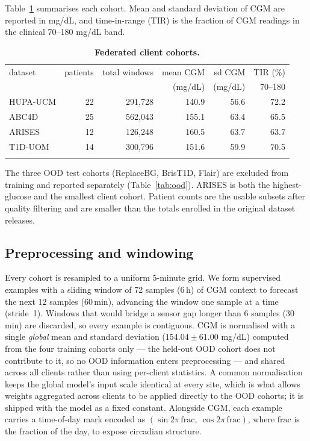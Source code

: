 \documentclass[10pt,letterpaper]{article}
\newlength\savedwidth
\newcommand\thickhline{\noalign{\global\savedwidth\arrayrulewidth\global\arrayrulewidth 2pt}%
\hline
\noalign{\global\arrayrulewidth\savedwidth}}
\begin{document}
Table~\ref{tab:datasets} summarises each cohort. Mean and standard deviation of
CGM are reported in mg/dL, and time-in-range (TIR) is the fraction of CGM
readings in the clinical 70--180 mg/dL band.

\begin{table}[!ht]
\centering
\captionsetup{justification=centering,singlelinecheck=on}
\caption{\bf Federated client cohorts.}
\label{tab:datasets}
\begin{tabular}{lrrrrr}
\thickhline
dataset & patients & total windows & mean CGM & sd CGM & TIR (\%) \\
        &          &               & (mg/dL)  & (mg/dL) & 70--180  \\
\hline
HUPA-UCM & 22 & 291,728 & 140.9 & 56.6 & 72.2 \\
ABC4D    & 25 & 562,043 & 155.1 & 63.4 & 65.5 \\
ARISES   & 12 & 126,248 & 160.5 & 63.7 & 63.7 \\
T1D-UOM  & 14 & 300,796 & 151.6 & 59.9 & 70.5 \\
\thickhline
\end{tabular}
\begin{center}
{\small The three OOD test cohorts (ReplaceBG, BrisT1D, Flair) are excluded from
training and reported separately (Table~\ref{tab:ood}). ARISES is both the
highest-glucose and the smallest client cohort. Patient counts are the usable
subsets after quality filtering and are smaller than the totals enrolled in the
original dataset releases.}
\end{center}
\end{table}

\subsection*{Preprocessing and windowing}

Every cohort is resampled to a uniform 5-minute grid. We form supervised
examples with a sliding window of 72 samples (6\,h) of CGM context to forecast
the next 12 samples (60\,min), advancing the window one sample at a time
(stride~1). Windows that would bridge a sensor gap longer than 6 samples
(30\,min) are discarded, so every example is contiguous. CGM is normalised with
a single \emph{global} mean and standard deviation ($154.04 \pm 61.00$ mg/dL)
computed from the four training cohorts only --- the held-out OOD cohort does not
contribute to it, so no OOD information enters preprocessing --- and shared
across all clients rather than using per-client statistics. A common
normalisation keeps the global model's input scale identical at every site,
which is what allows weights aggregated across clients to be applied directly to
the OOD cohorts; it is shipped with the model as a fixed constant. Alongside CGM,
each example carries a time-of-day mark encoded
as $(\sin 2\pi\,\mathrm{frac},\ \cos 2\pi\,\mathrm{frac})$, where $\mathrm{frac}$
is the fraction of the day, to expose circadian structure.
\end{document}

